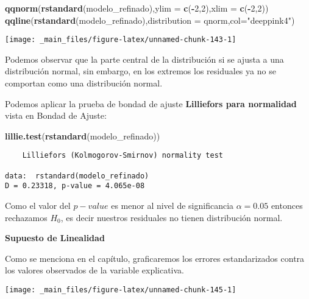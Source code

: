 \documentclass[
  a4paper,
  oneside,
  openany]{book}
\newenvironment{Shaded}{\begin{snugshade}}{\end{snugshade}}
\newcommand{\DataTypeTok}[1]{\textcolor[rgb]{0.13,0.29,0.53}{#1}}
\newcommand{\DecValTok}[1]{\textcolor[rgb]{0.00,0.00,0.81}{#1}}
\newcommand{\KeywordTok}[1]{\textcolor[rgb]{0.13,0.29,0.53}{\textbf{#1}}}
\newcommand{\NormalTok}[1]{#1}
\newcommand{\OperatorTok}[1]{\textcolor[rgb]{0.81,0.36,0.00}{\textbf{#1}}}
\newcommand{\StringTok}[1]{\textcolor[rgb]{0.31,0.60,0.02}{#1}}
\begin{document}
\begin{Shaded}
\begin{Highlighting}[]
\KeywordTok{qqnorm}\NormalTok{(}\KeywordTok{rstandard}\NormalTok{(modelo\_refinado),}\DataTypeTok{ylim =} \KeywordTok{c}\NormalTok{(}\OperatorTok{{-}}\DecValTok{2}\NormalTok{,}\DecValTok{2}\NormalTok{),}\DataTypeTok{xlim =} \KeywordTok{c}\NormalTok{(}\OperatorTok{{-}}\DecValTok{2}\NormalTok{,}\DecValTok{2}\NormalTok{))}
\KeywordTok{qqline}\NormalTok{(}\KeywordTok{rstandard}\NormalTok{(modelo\_refinado),}\DataTypeTok{distribution =}\NormalTok{ qnorm,}\DataTypeTok{col=}\StringTok{"deeppink4"}\NormalTok{)}
\end{Highlighting}
\end{Shaded}

\begin{center}\texttt{[image: \_main\_files/figure-latex/unnamed-chunk-143-1]} \end{center}

Podemos observar que la parte central de la distribución si se ajusta a una distribución normal, sin embargo, en los extremos los residuales ya no se comportan como una distribución normal.

Podemos aplicar la prueba de bondad de ajuste \textbf{Lilliefors para normalidad} vista en Bondad de Ajuste:

\begin{Shaded}
\begin{Highlighting}[]
\KeywordTok{lillie.test}\NormalTok{(}\KeywordTok{rstandard}\NormalTok{(modelo\_refinado))}
\end{Highlighting}
\end{Shaded}

\begin{verbatim}
    Lilliefors (Kolmogorov-Smirnov) normality test

data:  rstandard(modelo_refinado)
D = 0.23318, p-value = 4.065e-08
\end{verbatim}

Como el valor del \(p-value\) es menor al nivel de significancia \(\alpha=0.05\) entonces rechazamos \(H_{0}\), es decir nuestros residuales no tienen distribución normal.

\textbf{Supuesto de Linealidad}

Como se menciona en el capítulo, graficaremos los errores estandarizados contra los valores observados de la variable explicativa.

\begin{center}\texttt{[image: \_main\_files/figure-latex/unnamed-chunk-145-1]} \end{center}
\end{document}
